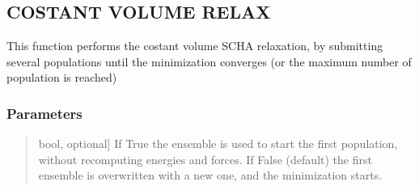 \documentclass[a4paper,11pt,english]{sphinxmanual}
\begin{document}
\begin{fulllineitems}
\label{\detokenize{apireference:sscha.Relax.SSCHA}}
\pysigstartsignatures
{}
\pysigstopsignatures{}

\begin{fulllineitems}
\label{\detokenize{apireference:sscha.Relax.SSCHA.relax}}
\pysigstartsignatures
{}
\pysigstopsignatures

\subsection{COSTANT VOLUME RELAX}
\label{\detokenize{apireference:costant-volume-relax}}
\sphinxAtStartPar
This function performs the costant volume SCHA relaxation, by submitting several populations
until the minimization converges (or the maximum number of population is reached)


\subsubsection{Parameters}
\label{\detokenize{apireference:id39}}\begin{quote}
\begin{description}
\sphinxlineitem{restart\_from\_ens}{[}bool, optional{]}
\sphinxAtStartPar
If True the ensemble is used to start the first population, without recomputing
energies and forces. If False (default) the first ensemble is overwritten with
a new one, and the minimization starts.


\end{description}
\end{quote}
\end{fulllineitems}
\end{fulllineitems}
\end{document}
